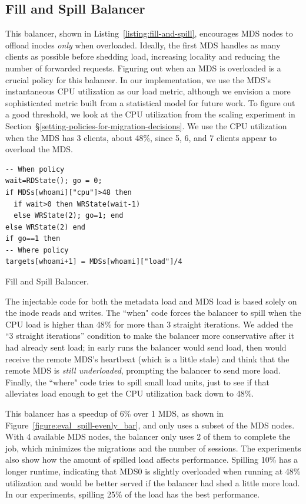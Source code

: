 \subsection{Fill and Spill Balancer}					%
\label{fill-and-spill-balancer}							%
This balancer, shown in Listing~\ref{listing:fill-and-spill}, encourages MDS nodes to offload inodes {\it only} when overloaded.  Ideally, the first MDS handles as many clients as possible before shedding load, increasing locality and reducing the number of forwarded requests. Figuring out when an MDS is overloaded is a crucial policy for this balancer. In our implementation, we use the MDS's instantaneous CPU utilization as our load metric, although we envision a more sophisticated metric built from a statistical model for future work. To figure out a good threshold, we look at the CPU utilization from the scaling experiment in Section~\S\ref{setting-policies-for-migration-decisions}. We use the CPU utilization when the MDS has 3 clients, about 48\%, since 5, 6, and 7 clients appear to overload the MDS.  

\begin{listing}
	\begin{verbatim}
-- When policy
wait=RDState(); go = 0;
if MDSs[whoami]["cpu"]>48 then
  if wait>0 then WRState(wait-1)
  else WRState(2); go=1; end
else WRState(2) end
if go==1 then
-- Where policy
targets[whoami+1] = MDSs[whoami]["load"]/4
	\end{verbatim}
    \caption{Fill and Spill Balancer.\label{listing:fill-and-spill}}
\end{listing}
The injectable code for both the metadata load and MDS load is based solely on the inode reads and writes. The ``when" code forces the balancer to spill when the CPU load is higher than 48\% for more than 3 straight iterations. We added the ``3 straight iterations'' condition to make the balancer more conservative after it had already sent load; in early runs the balancer would send load, then would receive the remote MDS's heartbeat (which is a little stale) and think that the remote MDS is {\it still underloaded}, prompting the balancer to send more load. Finally, the ``where" code tries to spill small load units, just to see if that alleviates load enough to get the CPU utilization back down to 48\%. 

This balancer has a speedup of 6\% over 1 MDS, as shown in Figure~\ref{figure:eval_spill-evenly_bar}, and only uses a subset of the MDS nodes. With 4 available MDS nodes, the balancer only uses 2 of them to complete the job, which minimizes the migrations and the number of sessions. The experiments also show how the amount of spilled load affects performance. Spilling 10\% has a longer runtime, indicating that MDS0 is slightly overloaded when running at 48\% utilization and would be better served if the balancer had shed a little more load. In our experiments, spilling 25\% of the load has the best performance.\\

